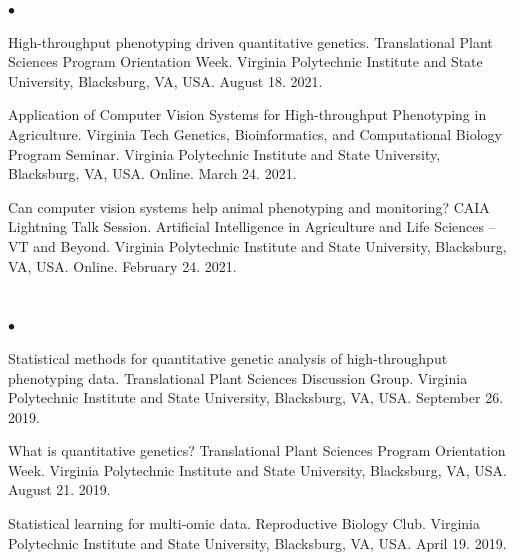 \documentclass[margin,line,10pt]{res}
\newenvironment{list2}{
  \begin{list}{$\bullet$}{%
      \setlength{\itemsep}{0in}
      \setlength{\parsep}{0in} \setlength{\parskip}{0in}
      \setlength{\topsep}{0in} \setlength{\partopsep}{0in} 
      \setlength{\leftmargin}{0.2in}}}{\end{list}}
\begin{document}
\begin{resume}
\begin{list2}
    \item [{\bf 17}.] High-throughput phenotyping driven quantitative genetics. Translational Plant Sciences Program Orientation Week. Virginia Polytechnic Institute and State University, Blacksburg, VA, USA. August 18. 2021.

          \vspace{0.5cm}

\item [{\bf 16}.] Application of Computer Vision Systems for High-throughput Phenotyping in Agriculture. Virginia Tech Genetics, Bioinformatics, and Computational Biology Program Seminar. Virginia Polytechnic Institute and State University, Blacksburg, VA, USA. Online. March 24. 2021.

  \vspace{0.5cm}


  \item [{\bf 15}.] Can computer vision systems help animal phenotyping and monitoring? CAIA Lightning Talk Session. Artificial Intelligence in Agriculture and Life Sciences – VT and Beyond. Virginia Polytechnic Institute and State University, Blacksburg, VA, USA. Online. February 24. 2021.
\end{list2}





\section{}
\begin{list2}
\item [{\bf 14}.] Statistical methods for quantitative genetic analysis of high-throughput phenotyping data. Translational Plant Sciences Discussion Group. Virginia Polytechnic Institute and State University, Blacksburg, VA, USA. September 26. 2019.

  \vspace{0.5cm}

\item [{\bf 13}.] What is quantitative genetics? Translational Plant Sciences Program Orientation Week. Virginia Polytechnic Institute and State University, Blacksburg, VA, USA. August 21. 2019.
  
  \vspace{0.5cm}

\item [{\bf 12}.] Statistical learning for multi-omic data. Reproductive Biology Club. Virginia Polytechnic Institute and State University, Blacksburg, VA, USA. April 19. 2019.
\end{list2}  


\end{resume}
\end{document}
